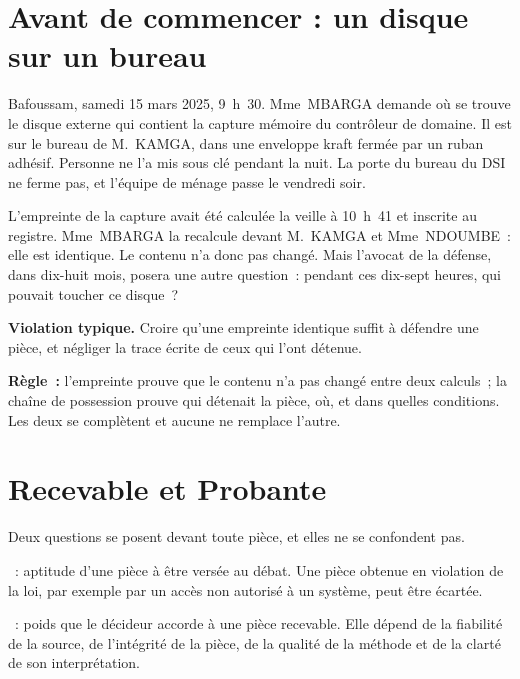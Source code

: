 \section*{Avant de commencer : un disque sur un bureau}

Bafoussam, samedi 15 mars 2025, 9~h~30. Mme~MBARGA demande où se trouve le
disque externe qui contient la capture mémoire du contrôleur de domaine. Il
est sur le bureau de M.~KAMGA, dans une enveloppe kraft fermée par un ruban
adhésif. Personne ne l'a mis sous clé pendant la nuit. La porte du bureau
du DSI ne ferme pas, et l'équipe de ménage passe le vendredi soir.

L'empreinte de la capture avait été calculée la veille à 10~h~41 et inscrite
au registre. Mme~MBARGA la recalcule devant M.~KAMGA et Mme~NDOUMBE~: elle
est identique. Le contenu n'a donc pas changé. Mais l'avocat de la défense,
dans dix-huit mois, posera une autre question~: pendant ces dix-sept heures,
qui pouvait toucher ce disque~?

\begin{boxalert}
\textbf{Violation typique.} Croire qu'une empreinte identique suffit à
défendre une pièce, et négliger la trace écrite de ceux qui l'ont détenue.

\smallskip
\textbf{Règle~:} l'empreinte prouve que le contenu n'a pas changé entre deux
calculs~; la chaîne de possession prouve qui détenait la pièce, où, et dans
quelles conditions. Les deux se complètent et aucune ne remplace l'autre.
\end{boxalert}

\separateur

\section{Recevable et Probante}
\label{sec:c02-recevable}

Deux questions se posent devant toute pièce, et elles ne se confondent pas.

\begin{boxdef}
\textbf{}~: aptitude d'une pièce à être versée au
débat. Une pièce obtenue en violation de la loi, par exemple par un accès
non autorisé à un système, peut être écartée.

\smallskip
\textbf{}~: poids que le décideur accorde à une
pièce recevable. Elle dépend de la fiabilité de la source, de l'intégrité de
la pièce, de la qualité de la méthode et de la clarté de son interprétation.
\end{boxdef}

